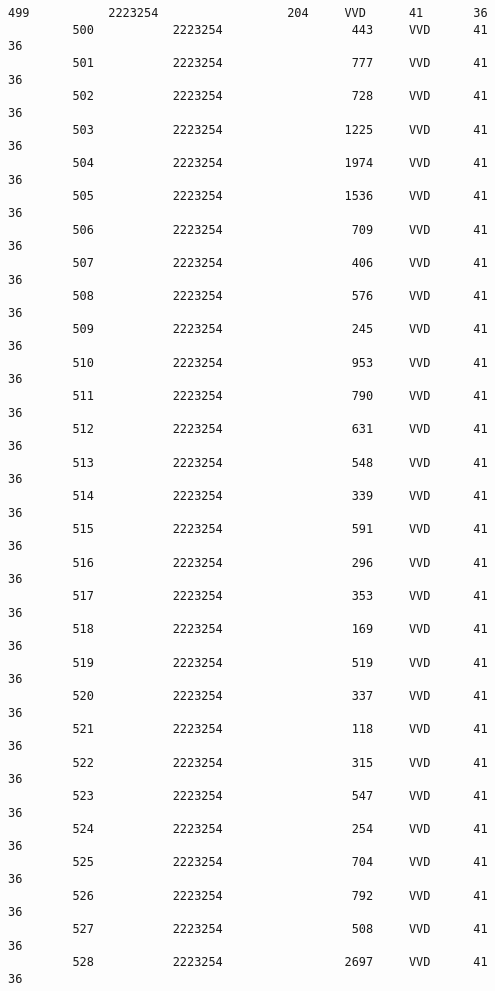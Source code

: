 \documentclass{article}
\begin{document}
\begin{Verbatim}[commandchars=\\\{\}]
         499           2223254                  204     VVD      41       36   
         500           2223254                  443     VVD      41       36   
         501           2223254                  777     VVD      41       36   
         502           2223254                  728     VVD      41       36   
         503           2223254                 1225     VVD      41       36   
         504           2223254                 1974     VVD      41       36   
         505           2223254                 1536     VVD      41       36   
         506           2223254                  709     VVD      41       36   
         507           2223254                  406     VVD      41       36   
         508           2223254                  576     VVD      41       36   
         509           2223254                  245     VVD      41       36   
         510           2223254                  953     VVD      41       36   
         511           2223254                  790     VVD      41       36   
         512           2223254                  631     VVD      41       36   
         513           2223254                  548     VVD      41       36   
         514           2223254                  339     VVD      41       36   
         515           2223254                  591     VVD      41       36   
         516           2223254                  296     VVD      41       36   
         517           2223254                  353     VVD      41       36   
         518           2223254                  169     VVD      41       36   
         519           2223254                  519     VVD      41       36   
         520           2223254                  337     VVD      41       36   
         521           2223254                  118     VVD      41       36   
         522           2223254                  315     VVD      41       36   
         523           2223254                  547     VVD      41       36   
         524           2223254                  254     VVD      41       36   
         525           2223254                  704     VVD      41       36   
         526           2223254                  792     VVD      41       36   
         527           2223254                  508     VVD      41       36   
         528           2223254                 2697     VVD      41       36   
         

\end{Verbatim}
\end{document}
